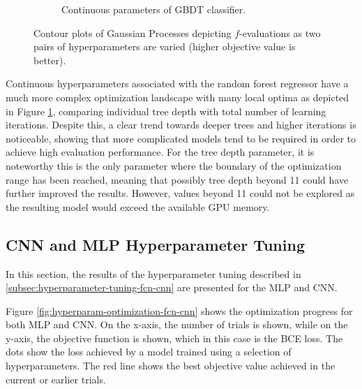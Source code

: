 \documentclass[runningheads]{llncs}
\begin{document}
\begin{figure}
\begin{subfigure}[b]{0.49\textwidth}
         \caption{Continuous parameters of GBDT classifier.}
         \label{fig:hyperparam-dataset-contour-plots--continuous-tree}
     \end{subfigure}
    \caption{Contour plots of Gaussian Processes depicting $f$-evaluations as two pairs of hyperparameters are varied (higher objective value is better).}
    \label{fig:hyperparam-dataset-contour-plots}
\end{figure}

Continuous hyperparameters associated with the random forest regressor have a much more complex optimization landscape with many local optima as depicted in Figure \ref{fig:hyperparam-dataset-contour-plots--continuous-tree}, comparing individual tree depth with total number of learning iterations. Despite this, a clear trend towards deeper trees and higher iterations is noticeable, showing that more complicated models tend to be required in order to achieve high evaluation performance. For the tree depth parameter, it is noteworthy this is the only parameter where the boundary of the optimization range has been reached, meaning that possibly tree depth beyond 11 could have further improved the results. However, values beyond 11 could not be explored as the resulting model would exceed the available GPU memory.










\subsection{CNN and MLP Hyperparameter Tuning}

In this section, the results of the hyperparameter tuning described in \ref{subsec:hyperparameter-tuning-fcn-cnn} are presented for the MLP and CNN. 

Figure \ref{fig:hyperparam-optimization-fcn-cnn} shows the optimization progress for both MLP and CNN. On the x-axis, the number of trials is shown, while on the y-axis, the objective function is shown, which in this case is the BCE loss. The dots show the loss achieved by a model trained using a selection of hyperparameters. The red line shows the best objective value achieved in the current or earlier trials.
\end{document}

